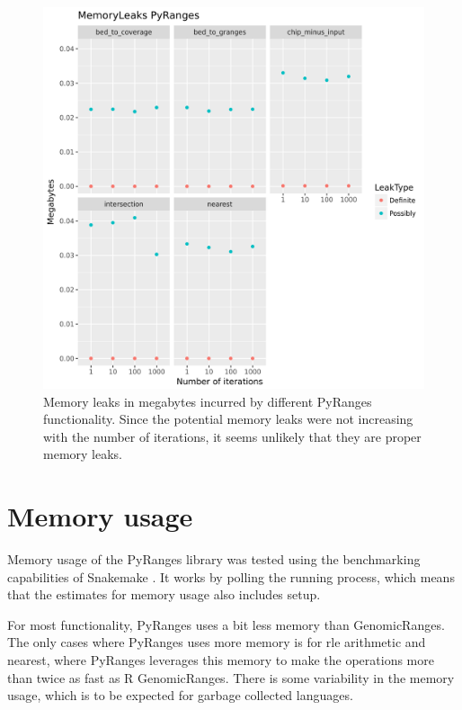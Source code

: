 \documentclass[10pt,letterpaper]{article}
\begin{document}
\begin{figure}
\includegraphics[width=1\textwidth]{graphs/memleak.png}
\caption{Memory leaks in megabytes incurred by different PyRanges functionality.
  Since the potential memory leaks were not increasing with the number of
  iterations, it seems unlikely that they are proper memory
  leaks.} %
\label{fig1} %
\end{figure} %

\section*{Memory usage}

Memory usage of the PyRanges library was tested using the benchmarking
capabilities of Snakemake \cite{doi:10.1093/bioinformatics/bty350}. It works by
polling the running process, which means that the estimates for memory usage
also includes setup.

For most functionality, PyRanges uses a bit less memory than GenomicRanges. The
only cases where PyRanges uses more memory is for rle arithmetic and nearest,
where PyRanges leverages this memory to make the operations more than twice as
fast as R GenomicRanges. There is some variability in the memory usage, which is
to be expected for garbage collected languages.
\end{document}
